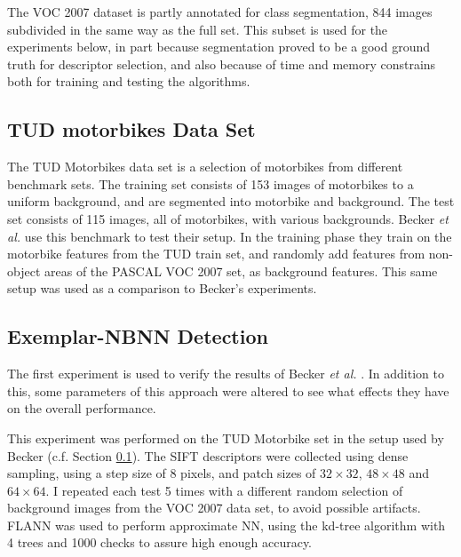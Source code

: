 The VOC 2007 dataset is partly annotated for class segmentation, 844 images subdivided in the same way as the full set. This subset is used for the experiments below, in part because segmentation proved to be a good ground truth for descriptor selection, and also because of time and memory constrains both for training and testing the algorithms.


\subsection{TUD motorbikes Data Set} %
\label{sec:tudmotorbikes_data_set}
The TUD Motorbikes data set is a selection of motorbikes from different benchmark sets. \cite{fritz2005integrating} The training set consists of 153 images of motorbikes to a uniform background, and are segmented into motorbike and background. The test set consists of 115 images, all of motorbikes, with various backgrounds. Becker \emph{et al.} \cite{becker2012codebook} use this benchmark to test their setup. In the training phase they train on the motorbike features from the TUD train set, and randomly add features from non-object areas of the PASCAL VOC 2007 set, as background features. This same setup was used as a comparison to Becker's experiments.



% 

\subsection{Exemplar-NBNN Detection} %
\label{sec:nbnn_detection}

The first experiment is used to verify the results of Becker \emph{et al.} \cite{becker2012codebook}. In addition to this, some parameters of this approach were altered to see what effects they have on the overall performance.

This experiment was performed on the TUD Motorbike set in the setup used by Becker (c.f. Section \ref{sec:tudmotorbikes_data_set}). The SIFT descriptors were collected using dense sampling, using a step size of 8 pixels, and patch sizes of $32\times32$, $48\times48$ and $64\times64$. I repeated each test 5 times with a different random selection of background images from the VOC 2007 data set, to avoid possible artifacts. FLANN was used to perform approximate NN, using the kd-tree algorithm with 4 trees and 1000 checks to assure high enough accuracy.


